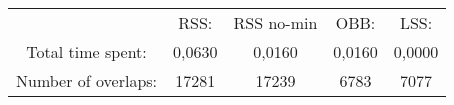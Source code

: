 \begin{tabular}{c|c|c|c|c}\\ 
& RSS: & RSS no-min & OBB: & LSS:\\ 
Total time spent: & 0,0630 & 0,0160 & 0,0160 & 0,0000\\ 
Number of overlaps: &17281 & 17239 & 6783 & 7077\\ 
\end{tabular}